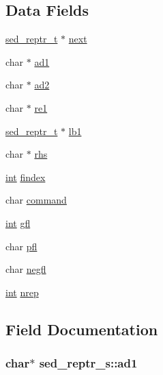 \subsection*{Data Fields}
\begin{DoxyCompactItemize}
\item 
\hyperlink{libsed_8h_a732387e56354bf438c15e5c9cd085237}{sed\+\_\+reptr\+\_\+t} $\ast$ \hyperlink{structsed__reptr__s_acae13c6e2cad98a888d6cf8a90dace3b}{next}
\item 
char $\ast$ \hyperlink{structsed__reptr__s_a8f2f212c06b98c1c0b5e40baebc8e43d}{ad1}
\item 
char $\ast$ \hyperlink{structsed__reptr__s_aec43217a6076a627a4dc79166e89ed65}{ad2}
\item 
char $\ast$ \hyperlink{structsed__reptr__s_a3b0e0917ce5c08a9d942159eacf18245}{re1}
\item 
\hyperlink{libsed_8h_a732387e56354bf438c15e5c9cd085237}{sed\+\_\+reptr\+\_\+t} $\ast$ \hyperlink{structsed__reptr__s_a96dbf4377fcb225c617bdcce00f53c94}{lb1}
\item 
char $\ast$ \hyperlink{structsed__reptr__s_a011c6ad16de2bf8d1c041b344761558e}{rhs}
\item 
\hyperlink{pcre_8txt_a42dfa4ff673c82d8efe7144098fbc198}{int} \hyperlink{structsed__reptr__s_ac86f08eccad7695979c21fa219c62ccd}{findex}
\item 
char \hyperlink{structsed__reptr__s_a9da4bf8678721be434123e107586b8dd}{command}
\item 
\hyperlink{pcre_8txt_a42dfa4ff673c82d8efe7144098fbc198}{int} \hyperlink{structsed__reptr__s_ae3bbc61ec8abed22772aa8a70aba1831}{gfl}
\item 
char \hyperlink{structsed__reptr__s_a622e5e7af375c5d04281c1d45b0bead2}{pfl}
\item 
char \hyperlink{structsed__reptr__s_ac5b58c651a65d9c18ce7f57d3b232ef6}{negfl}
\item 
\hyperlink{pcre_8txt_a42dfa4ff673c82d8efe7144098fbc198}{int} \hyperlink{structsed__reptr__s_ac10213e185bbfb6e4f0963d985f9d6b9}{nrep}
\end{DoxyCompactItemize}


\subsection{Field Documentation}
\subsubsection[{\texorpdfstring{ad1}{ad1}}]{\setlength{\rightskip}{0pt plus 5cm}char$\ast$ sed\+\_\+reptr\+\_\+s\+::ad1}\hypertarget{structsed__reptr__s_a8f2f212c06b98c1c0b5e40baebc8e43d}{}\label{structsed__reptr__s_a8f2f212c06b98c1c0b5e40baebc8e43d}
